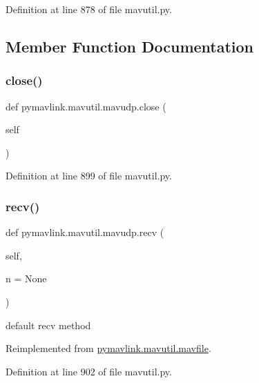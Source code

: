 Definition at line 878 of file mavutil.\+py.



\subsection{Member Function Documentation}
\mbox{\label{classpymavlink_1_1mavutil_1_1mavudp_ae4b43c09ce3d1304545c9a333bec9cff}} 
\subsubsection{\texorpdfstring{close()}{close()}}
{\footnotesize\ttfamily def pymavlink.\+mavutil.\+mavudp.\+close (\begin{DoxyParamCaption}\item[{}]{self }\end{DoxyParamCaption})}



Definition at line 899 of file mavutil.\+py.

\mbox{\label{classpymavlink_1_1mavutil_1_1mavudp_a0381f8262ab6149604e902339c5a4a53}} 
\subsubsection{\texorpdfstring{recv()}{recv()}}
{\footnotesize\ttfamily def pymavlink.\+mavutil.\+mavudp.\+recv (\begin{DoxyParamCaption}\item[{}]{self,  }\item[{}]{n = {\ttfamily None} }\end{DoxyParamCaption})}

\begin{DoxyVerb}default recv method\end{DoxyVerb}
 

Reimplemented from \mbox{\hyperlink{classpymavlink_1_1mavutil_1_1mavfile_a09cb800fc6b03949ace05ce320539be2}{pymavlink.\+mavutil.\+mavfile}}.



Definition at line 902 of file mavutil.\+py.

